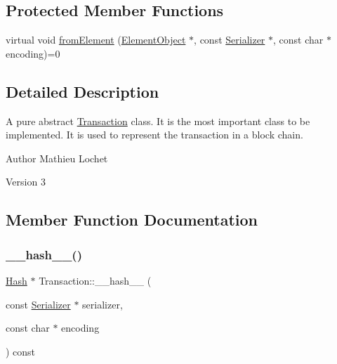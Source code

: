 \subsection*{Protected Member Functions}
\begin{DoxyCompactItemize}
\item 
virtual void \mbox{\hyperlink{classComponent_a2ded18881226d0077dc393e0e9304bb1}{from\+Element}} (\mbox{\hyperlink{classElementObject}{Element\+Object}} $\ast$, const \mbox{\hyperlink{classSerializer}{Serializer}} $\ast$, const char $\ast$encoding)=0
\end{DoxyCompactItemize}


\subsection{Detailed Description}
A pure abstract \mbox{\hyperlink{classTransaction}{Transaction}} class. It is the most important class to be implemented. It is used to represent the transaction in a block chain.

\begin{DoxyAuthor}{Author}
Mathieu Lochet 
\end{DoxyAuthor}
\begin{DoxyVersion}{Version}
3 
\end{DoxyVersion}


\subsection{Member Function Documentation}
\mbox{\label{classTransaction_a1f0df166c34d6a38a991544cf98c0356}} 
\subsubsection{\texorpdfstring{\+\_\+\+\_\+hash\+\_\+\+\_\+()}{\_\_hash\_\_()}}
{\footnotesize\ttfamily \mbox{\hyperlink{classHash}{Hash}} $\ast$ Transaction\+::\+\_\+\+\_\+hash\+\_\+\+\_\+ (\begin{DoxyParamCaption}\item[{const \mbox{\hyperlink{classSerializer}{Serializer}} $\ast$}]{serializer,  }\item[{const char $\ast$}]{encoding }\end{DoxyParamCaption}) const}

